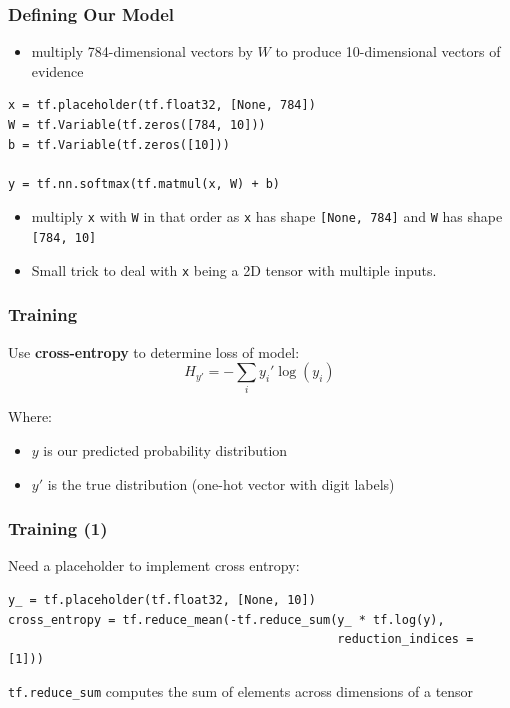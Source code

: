 \documentclass[11pt]{article}
\begin{document}
\subsubsection*{Defining Our Model}
\label{sec:orge57a8ea}
\begin{itemize}
\item multiply 784-dimensional vectors by \(W\) to produce 10-dimensional vectors of evidence
\end{itemize}
\begin{verbatim}
x = tf.placeholder(tf.float32, [None, 784])
W = tf.Variable(tf.zeros([784, 10]))
b = tf.Variable(tf.zeros([10]))

y = tf.nn.softmax(tf.matmul(x, W) + b)
\end{verbatim}
\begin{itemize}
\item multiply \texttt{x} with \texttt{W} in that order as \texttt{x} has shape \texttt{[None, 784]} and \texttt{W} has shape \texttt{[784, 10]}
\item Small trick to deal with \texttt{x} being a 2D tensor with multiple inputs.
\end{itemize}
\subsubsection*{Training}
\label{sec:org2b67b4a}
Use \textbf{cross-entropy} to determine loss of model:
$$H_{y'}=-\sum_{i} y_i' \log(y_i)$$

Where:
\begin{itemize}
\item \(y\) is our predicted probability distribution
\item \(y'\) is the true distribution (one-hot vector with digit labels)
\end{itemize}
\subsubsection*{Training (1)}
\label{sec:org9c93a62}
Need a placeholder to implement cross entropy:

\begin{verbatim}
y_ = tf.placeholder(tf.float32, [None, 10])
cross_entropy = tf.reduce_mean(-tf.reduce_sum(y_ * tf.log(y), 
                                              reduction_indices = [1]))
\end{verbatim}

\texttt{tf.reduce\_sum} computes the sum of elements across dimensions of a tensor
\end{document}
